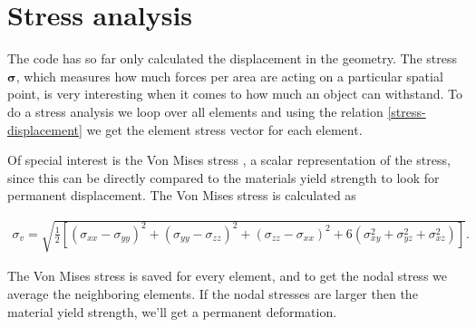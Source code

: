 \section{Stress analysis}
\label{sec:stress}

The code has so far only calculated the displacement in the geometry. The stress $\bm{\sigma}$, which measures how much forces per area are acting on a particular spatial point, is very interesting when it comes to how much an object can withstand. To do a stress analysis we loop over all elements and using the relation \eqref{stress-displacement} we get the element stress vector for each element.

Of special interest is the Von Mises stress \cite{VonMises}, a scalar representation of the stress, since this can be directly compared to the materials yield strength to look for permanent displacement. The Von Mises stress is calculated as 

\begin{align*}
\sigma_{v} = \sqrt{ \frac{1}{2} \left[  (\sigma_{xx} -\sigma_{yy})^2 + (\sigma_{yy} -\sigma_{zz})^2 + (\sigma_{zz} -\sigma_{xx})^2 + 6\left(\sigma_{xy}^2 + \sigma_{yz}^2 + \sigma_{xz}^2 \right) \right]}.
\end{align*}


The Von Mises stress is saved for every element, and to get the nodal stress we average the neighboring elements. If the nodal stresses are larger then the material yield strength, we'll get a permanent deformation.